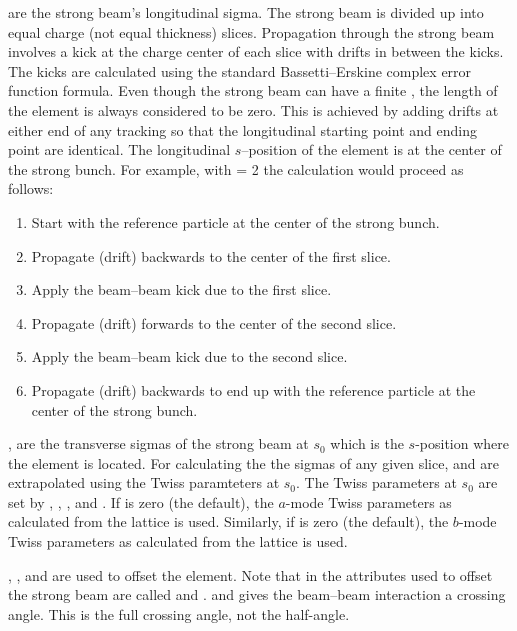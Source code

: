  are the strong beam's longitudinal sigma.
The strong beam is divided up into  equal charge (not
equal thickness) slices. Propagation through the strong beam involves
a kick at the charge center of each slice with drifts in between the
kicks. The kicks are calculated using the standard Bassetti--Erskine
complex error function formula\cite{b:talman}.  Even though the strong
beam can have a finite , the length of the element is always
considered to be zero. This is achieved by adding drifts at either end
of any tracking so that the longitudinal starting point and ending
point are identical. The longitudinal $s$--position of the
 element is at the center of the strong bunch. For
example, with  = 2 the calculation would proceed as
follows:
\begin{enumerate}
  \item  Start with the reference particle at the center of the strong bunch.
  \item  Propagate (drift) backwards to the center of the first slice.
  \item  Apply the beam--beam kick due to the first slice.
  \item  Propagate (drift) forwards to the center of the second slice.
  \item  Apply the beam--beam kick due to the second slice.
  \item  Propagate (drift) backwards to end up with the reference particle
     at the center of the strong bunch.
\end{enumerate}

,  are the transverse sigmas of the strong beam
at $s_0$ which is the $s$-position where the  element is located. 
For calculating the the sigmas of any given slice,  and  
are extrapolated using the Twiss paramteters at $s_0$. The Twiss parameters
at $s_0$ are set by , , , and .
If  is zero (the default), the $a$-mode Twiss parameters as 
calculated from the lattice is used. Similarly, 
if  is zero (the default), the $b$-mode Twiss parameters as 
calculated from the lattice is used.


, , and  are used to offset the
 element. Note that in \mad the attributes used to
offset the strong beam are called  and .
 and  gives the beam--beam interaction a
crossing angle. This is the full crossing angle, not the half-angle.

